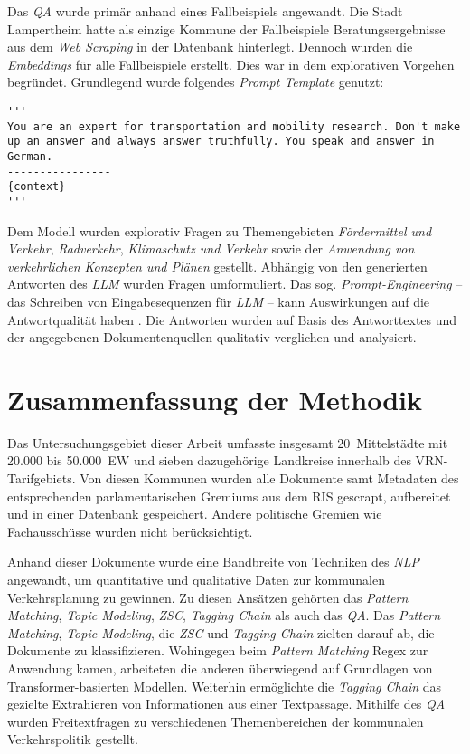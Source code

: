 Das \textit{QA} wurde primär anhand eines Fallbeispiels angewandt. Die Stadt Lampertheim hatte als einzige Kommune der Fallbeispiele Beratungsergebnisse aus dem \textit{Web Scraping} in der Datenbank hinterlegt. Dennoch wurden die \textit{Embeddings} für alle Fallbeispiele erstellt. Dies war in dem explorativen Vorgehen begründet. Grundlegend wurde folgendes \textit{Prompt Template} genutzt: 
\begingroup
\nopagebreak
\begin{lstlisting}
'''
You are an expert for transportation and mobility research. Don't make up an answer and always answer truthfully. You speak and answer in German.
----------------
{context}
'''
\end{lstlisting}
\endgroup

Dem Modell wurden explorativ Fragen zu Themengebieten \textit{Fördermittel und Verkehr}, \textit{Radverkehr}, \textit{Klimaschutz und Verkehr} sowie der \textit{Anwendung von verkehrlichen Konzepten und Plänen} gestellt. Abhängig von den generierten Antworten des \textit{LLM} wurden Fragen umformuliert. Das sog. \textit{Prompt-Engineering} -- das Schreiben von Eingabesequenzen für \textit{LLM} -- kann Auswirkungen auf die Antwortqualität haben \parencite[2]{yao2023}. Die Antworten wurden auf Basis des Antworttextes und der angegebenen Dokumentenquellen qualitativ verglichen und analysiert.




\section{Zusammenfassung der Methodik}

Das Untersuchungsgebiet dieser Arbeit umfasste insgesamt 20~Mittelstädte mit 20.000 bis 50.000~EW und sieben dazugehörige Landkreise innerhalb des VRN-Tarifgebiets. Von diesen Kommunen wurden alle Dokumente samt Metadaten des entsprechenden parlamentarischen Gremiums aus dem RIS gescrapt, aufbereitet und in einer Datenbank gespeichert. Andere politische Gremien wie Fachausschüsse wurden nicht berücksichtigt.

Anhand dieser Dokumente wurde eine Bandbreite von Techniken des \textit{NLP} angewandt, um quantitative und qualitative Daten zur kommunalen Verkehrsplanung zu gewinnen. Zu diesen Ansätzen gehörten das \textit{Pattern Matching}, \textit{Topic Modeling}, \textit{ZSC}, \textit{Tagging Chain} als auch das \textit{QA}. Das \textit{Pattern Matching}, \textit{Topic Modeling}, die \textit{ZSC} und \textit{Tagging Chain} zielten darauf ab, die Dokumente zu klassifizieren. Wohingegen beim \textit{Pattern Matching} Regex zur Anwendung kamen, arbeiteten die anderen überwiegend auf Grundlagen von Transformer-basierten Modellen. Weiterhin ermöglichte die \textit{Tagging Chain} das gezielte Extrahieren von Informationen aus einer Textpassage. Mithilfe des \textit{QA} wurden Freitextfragen zu verschiedenen Themenbereichen der kommunalen Verkehrspolitik gestellt.


